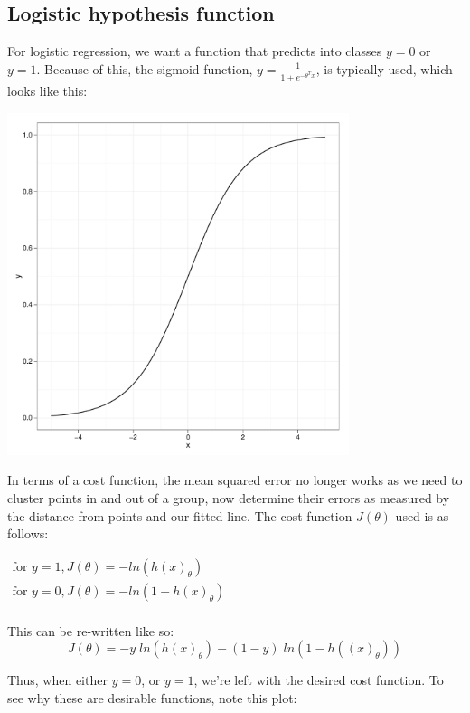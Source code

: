 \documentclass[11pt]{article}
\begin{document}
\subsection{Logistic hypothesis function}
\label{sec-3-2}


For logistic regression, we want a function that predicts into classes \(y=0\) or
\(y=1\). Because of this, the sigmoid function, \(y = \frac{1}{1 + e^{-\theta^T x}}\), is
typically used, which looks like this:



\includegraphics[width=10cm]{./plots/sigmoid.pdf}

In terms of a cost function, the mean squared error no longer works as we need to
cluster points in and out of a group, now determine their errors as measured by the
distance from points and our fitted line. The cost function \(J(\theta)\) used is as
follows:

\(
\begin{array}{l}
\textrm{for } y=1, J(\theta) = - ln(h(x)_\theta) \\
\textrm{for } y=0, J(\theta) = - ln(1 - h(x)_\theta) \\
\end{array}
\)

This can be re-written like so:
\[
J(\theta) = -y \; ln(h(x)_\theta) - (1-y) \; ln(1-h((x)_\theta))
\]

Thus, when either \(y=0\), or \(y=1\), we're left with the desired cost function. To
see why these are desirable functions, note this plot:
\end{document}
